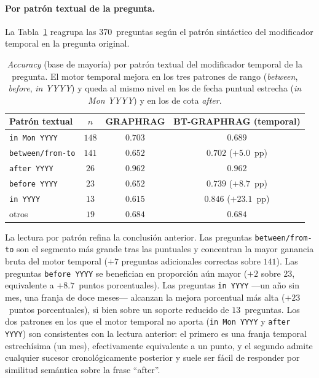 \paragraph{Por patrón textual de la pregunta.} La Tabla~\ref{tab:eval-timeqa-by-bucket} reagrupa las 370~preguntas según el patrón sintáctico del modificador temporal en la pregunta original.

\begin{table}[h]
\centering
\small
\begin{tabular}{lccc}
\hline
\textbf{Patrón textual} & \textbf{$n$} & \textbf{GRAPHRAG} & \textbf{BT-GRAPHRAG (temporal)} \\ \hline
\texttt{in Mon YYYY}      & $148$ & $0.703$ & $0.689$  \\
\texttt{between/from-to}  & $141$ & $0.652$ & $\mathbf{0.702}$ \quad ($+5.0$~pp) \\
\texttt{after YYYY}       & $26$  & $0.962$ & $0.962$  \\
\texttt{before YYYY}      & $23$  & $0.652$ & $\mathbf{0.739}$ \quad ($+8.7$~pp) \\
\texttt{in YYYY}          & $13$  & $0.615$ & $\mathbf{0.846}$ \quad ($+23.1$~pp) \\
otros                     & $19$  & $0.684$ & $0.684$  \\ \hline
\end{tabular}
\caption{\emph{Accuracy} (base de mayoría) por patrón textual del modificador temporal de la pregunta. El motor temporal mejora en los tres patrones de rango (\emph{between}, \emph{before}, \emph{in YYYY}) y queda al mismo nivel en los de fecha puntual estrecha (\emph{in Mon YYYY}) y en los de cota \emph{after}.}
\label{tab:eval-timeqa-by-bucket}
\end{table}

La lectura por patrón refina la conclusión anterior. Las preguntas \texttt{between/from-to} son el segmento más grande tras las puntuales y concentran la mayor ganancia bruta del motor temporal ($+7$ preguntas adicionales correctas sobre $141$). Las preguntas \texttt{before YYYY} se benefician en proporción aún mayor ($+2$ sobre $23$, equivalente a $+8.7$~puntos porcentuales). Las preguntas \texttt{in YYYY} ---un año sin mes, una franja de doce meses--- alcanzan la mejora porcentual más alta ($+23$~puntos porcentuales), si bien sobre un soporte reducido de $13$~preguntas. Los dos patrones en los que el motor temporal no aporta (\texttt{in Mon YYYY} y \texttt{after YYYY}) son consistentes con la lectura anterior: el primero es una franja temporal estrechísima (un mes), efectivamente equivalente a un punto, y el segundo admite cualquier sucesor cronológicamente posterior y suele ser fácil de responder por similitud semántica sobre la frase ``after''.

